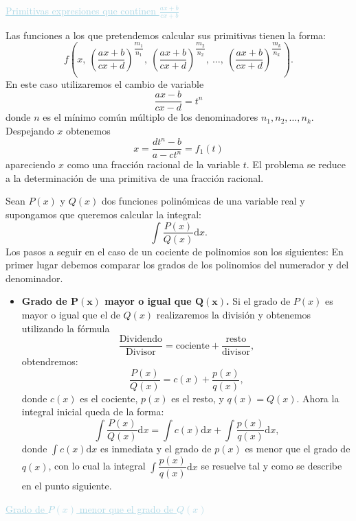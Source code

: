 \textcolor{lightblue}{\underline{Primitivas expresiones que continen $\textstyle\frac{ax+b}{cx+b}$}}

Las funciones a los que pretendemos calcular sus primitivas tienen la forma: \[ f\left(x,~\left(\dfrac{ax+b}{cx+d}\right)^{\dfrac{m_1}{n_1}},~\left(\dfrac{ax+b}{cx+d}\right)^{\dfrac{m_2}{n_2}},~\hdots,~\left(\dfrac{ax+b}{cx+d}\right)^{\dfrac{m_k}{n_k}}\right). \]
En este caso utilizaremos el cambio de variable \[ \dfrac{ax-b}{cx-d}=t^n \] donde $n$ es el mínimo común múltiplo de los denominadores $n_1,n_2,\hdots,n_k$. Despejando $x$ obtenemos \[ x=\dfrac{dt^n-b}{a-ct^n}=f_1(t) \] apareciendo $x$ como una fracción racional de la variable $t$. El problema se reduce a la determinación de una primitiva de una fracción racional. 

Sean $P(x)$ y $Q(x)$ dos funciones polinómicas de una variable real y supongamos que queremos calcular la integral: \[ \int\dfrac{P(x)}{Q(x)}\mathrm{d}x. \]
Los pasos a seguir en el caso de un cociente de polinomios son los siguientes: En primer lugar debemos comparar los grados de los polinomios del numerador y del denominador.
\begin{itemize}
	\item \textbf{Grado de $\mathbf{P(x)}$ mayor o igual que $\mathbf{Q(x)}$. }Si el grado de $P(x)$ es mayor o igual que el de $Q(x)$ realizaremos la división y obtenemos utilizando la fórmula \[ \dfrac{\text{Dividendo}}{\text{Divisor}}=\text{cociente}+\dfrac{\text{resto}}{\text{divisor}}, \] obtendremos: \[\dfrac{P(x)}{Q(x)}=c(x)+\dfrac{p(x)}{q(x)},  \] donde $c(x)$ es el cociente, $p(x)$ es el resto, y $q(x)=Q(x)$. Ahora la integral inicial queda de la forma: \[ \int\dfrac{P(x)}{Q(x)}\mathrm{d}x=\int c(x)\mathrm{d}x+\int\dfrac{p(x)}{q(x)}\mathrm{d}x, \]  donde $\int c(x)\mathrm{d}x$ es inmediata y el grado de $p(x)$ es menor que el grado de $q(x)$, con lo cual la integral $\int\dfrac{p(x)}{q(x)}\mathrm{d}x$ se resuelve tal y como se describe en el punto siguiente.
\end{itemize}

\textcolor{lightblue}{\underline{Grado de $P(x)$ menor que el grado de $Q(x)$}}

